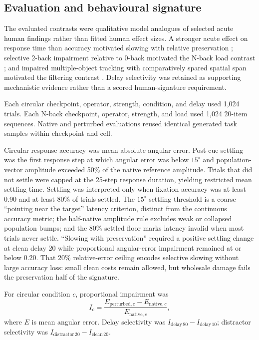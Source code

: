 \documentclass[11pt,reprint,aps,prl,floatfix,secnumarabic]{revtex4-2}
\begin{document}
\subsection{Evaluation and behavioural signature}

The evaluated contrasts were qualitative model analogues of selected acute
human findings rather than fitted human effect sizes. A stronger acute effect
on response time than accuracy motivated slowing with relative preservation
\cite{yousefi2025}; selective 2-back impairment relative to 0-back motivated
the N-back load contrast \cite{barrett2018}; and impaired multiple-object
tracking with comparatively spared spatial span motivated the filtering
contrast \cite{carter2005}. Delay selectivity was retained as supporting
mechanistic evidence rather than a scored human-signature requirement.

Each circular checkpoint, operator, strength, condition, and delay used 1,024
trials. Each N-back checkpoint, operator, strength, and load used 1,024
20-item sequences. Native and perturbed evaluations reused identical generated
task samples within checkpoint and cell.

Circular response accuracy was mean absolute angular error. Post-cue settling
was the first response step at which angular error was below $15^\circ$ and
population-vector amplitude exceeded 50\% of the native reference amplitude.
Trials that did not settle were capped at the 25-step response duration,
yielding restricted mean settling time. Settling was interpreted only when
fixation accuracy was at least 0.90 and at least 80\% of trials settled.
The $15^\circ$ settling threshold is a coarse ``pointing near the target''
latency criterion, distinct from the continuous accuracy metric; the
half-native amplitude rule excludes weak or collapsed population bumps; and
the 80\% settled floor marks latency invalid when most trials never settle.
``Slowing with preservation'' required a positive settling change at clean
delay 20 while proportional angular-error impairment remained at or below
0.20. That 20\% relative-error ceiling encodes selective slowing without large
accuracy loss: small clean costs remain allowed, but wholesale damage fails
the preservation half of the signature.

For circular condition $c$, proportional impairment was
\begin{equation}
 I_c=\frac{E_{\mathrm{perturbed},c}-E_{\mathrm{native},c}}
 {E_{\mathrm{native},c}},
\end{equation}
where $E$ is mean angular error. Delay selectivity was
$I_{\mathrm{delay\,80}}-I_{\mathrm{delay\,10}}$; distractor selectivity was
$I_{\mathrm{distractor\,20}}-I_{\mathrm{clean\,20}}$.
\end{document}
